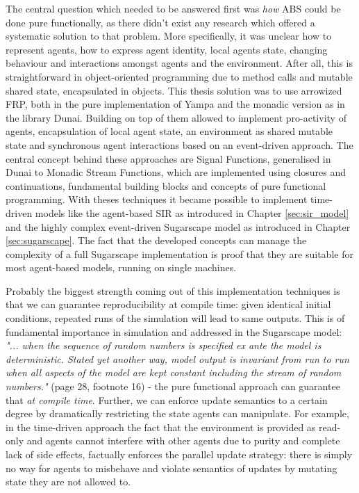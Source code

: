The central question which needed to be answered first was \textit{how} ABS could be done pure functionally, as there didn't exist any research which offered a systematic solution to that problem. More specifically, it was unclear how to represent agents, how to express agent identity, local agents state, changing behaviour and interactions amongst agents and the environment. After all, this is straightforward in object-oriented programming due to method calls and mutable shared state, encapsulated in objects. This thesis solution was to use arrowized FRP, both in the pure implementation of Yampa and the monadic version as in the library Dunai. Building on top of them allowed to implement pro-activity of agents, encapsulation of local agent state, an environment as shared mutable state and synchronous agent interactions based on an event-driven approach. The central concept behind these approaches are Signal Functions, generalised in Dunai to Monadic Stream Functions, which are implemented using closures and continuations, fundamental building blocks and concepts of pure functional programming. With theses techniques it became possible to implement time-driven models like the agent-based SIR as introduced in Chapter \ref{sec:sir_model} and the highly complex event-driven Sugarscape model as introduced in Chapter \ref{sec:sugarscape}. The fact that the developed concepts can manage the complexity of a full Sugarscape implementation is proof that they are suitable for most agent-based models, running on single machines. 

Probably the biggest strength coming out of this implementation techniques is that we can guarantee reproducibility at compile time: given identical initial conditions, repeated runs of the simulation will lead to same outputs. This is of fundamental importance in simulation and addressed in the Sugarscape model: \textit{"... when the sequence of random numbers is specified ex ante the model is deterministic. Stated yet another way, model output is invariant from run to run when all aspects of the model are kept constant including the stream of random numbers."} (page 28, footnote 16) - the pure functional approach can guarantee that \textit{at compile time}. Further, we can enforce update semantics to a certain degree by dramatically restricting the state agents can manipulate. For example, in the time-driven approach the fact that the environment is provided as read-only and agents cannot interfere with other agents due to purity and complete lack of side effects, factually enforces the parallel update strategy: there is simply no way for agents to misbehave and violate semantics of updates by mutating state they are not allowed to.

